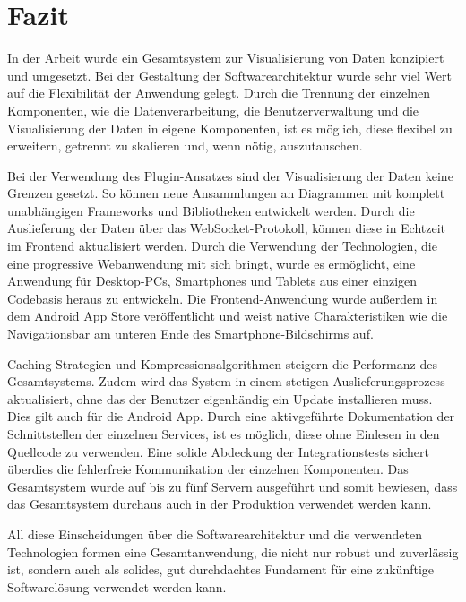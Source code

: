 \chapter{Fazit}
\label{chap:fazit}

In der Arbeit wurde ein Gesamtsystem zur Visualisierung von Daten konzipiert und
umgesetzt. Bei der Gestaltung der Softwarearchitektur wurde sehr viel Wert auf
die Flexibilität der Anwendung gelegt. Durch die Trennung der einzelnen Komponenten,
wie die Datenverarbeitung, die Benutzerverwaltung und die Visualisierung der Daten
in eigene Komponenten, ist es möglich, diese flexibel zu erweitern,
getrennt zu skalieren und, wenn nötig, auszutauschen. 

Bei der Verwendung des Plugin-Ansatzes sind der Visualisierung der Daten keine Grenzen gesetzt.
So können neue Ansammlungen an Diagrammen mit komplett unabhängigen Frameworks und
Bibliotheken entwickelt werden. Durch die Auslieferung der Daten über
das WebSocket-Protokoll, können diese in Echtzeit im Frontend aktualisiert werden.
Durch die Verwendung der Technologien, die eine progressive Webanwendung mit sich bringt,
wurde es ermöglicht, eine Anwendung für Desktop-PCs, Smartphones und Tablets aus einer einzigen
Codebasis heraus zu entwickeln. Die Frontend-Anwendung wurde außerdem in dem Android App Store
veröffentlicht und weist native Charakteristiken wie die Navigationsbar am unteren
Ende des Smartphone-Bildschirms auf. 

Caching-Strategien und Kompressionsalgorithmen steigern die Performanz des Gesamtsystems.
Zudem wird das System in einem stetigen Auslieferungsprozess aktualisiert, ohne das
der Benutzer eigenhändig ein Update installieren muss. Dies gilt auch für die Android App.
Durch eine aktivgeführte Dokumentation der Schnittstellen der einzelnen Services,
ist es möglich, diese ohne Einlesen in den Quellcode zu verwenden. Eine solide Abdeckung der Integrationstests sichert überdies die
fehlerfreie Kommunikation der einzelnen Komponenten. Das Gesamtsystem wurde auf bis zu
fünf Servern ausgeführt und somit bewiesen, dass das Gesamtsystem durchaus auch in der Produktion
verwendet werden kann.

All diese Einscheidungen über die Softwarearchitektur und die verwendeten Technologien
formen eine Gesamtanwendung, die nicht nur robust und zuverlässig ist, sondern auch
als solides, gut durchdachtes Fundament für eine zukünftige Softwarelösung
verwendet werden kann.
